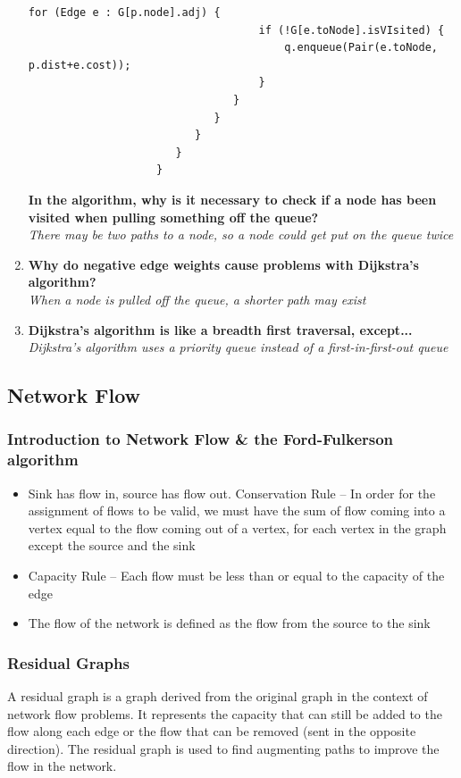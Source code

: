 \documentclass[10pt]{article}
\begin{document}
\begin{enumerate}
\begin{lstlisting}[style=java]
                                for (Edge e : G[p.node].adj) {
                                    if (!G[e.toNode].isVIsited) {
                                        q.enqueue(Pair(e.toNode, p.dist+e.cost));
                                    }
                                }
                             }
                          }
                       }
                    }
                \end{lstlisting}
          \textbf{In the algorithm, why is it necessary to check if a node has been visited when pulling something off the queue?}\\
          \textit{There may be two paths to a node, so a node could get put on the queue twice}
    \item \textbf{Why do negative edge weights cause problems with Dijkstra's algorithm?}\\
          \textit{When a node is pulled off the queue, a shorter path may exist}
    \item \textbf{Dijkstra's algorithm is like a breadth first traversal, except...}\\
          \textit{Dijkstra's algorithm uses a priority queue instead of a first-in-first-out queue}
\end{enumerate}

\subsection{Network Flow}
\subsubsection{Introduction to Network Flow \& the Ford-Fulkerson algorithm}
\begin{itemize}
    \item Sink has flow in, source has flow out. Conservation Rule – In order for the assignment of flows to be valid, we must have the sum of flow coming into a vertex equal to the flow coming out of a vertex, for each vertex in the graph except the source and the sink
    \item Capacity Rule – Each flow must be less than or equal to the capacity of the edge
    \item The flow of the network is defined as the flow from the source to the sink

\end{itemize}
\subsubsection{Residual Graphs}
A residual graph is a graph derived from the original graph in the context of network flow problems. It represents the capacity that can still be added to the flow along each edge or the flow that can be removed (sent in the opposite direction). The residual graph is used to find augmenting paths to improve the flow in the network.
\end{document}
